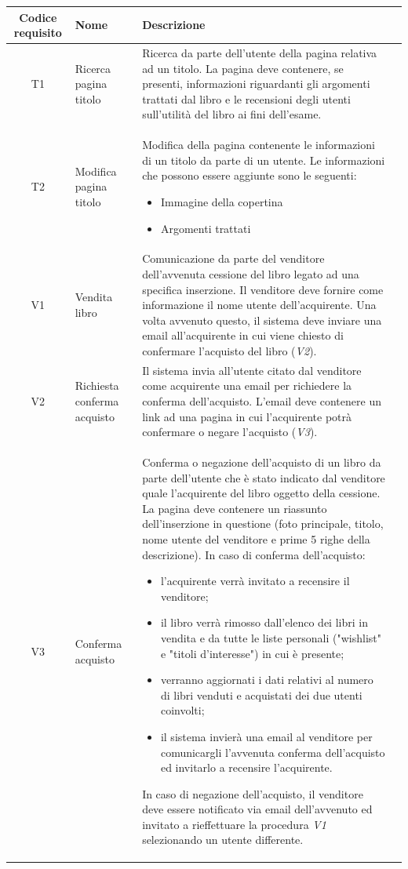 \documentclass[10pt,a4paper]{report}
\begin{document}
	\begin{tabular}{cp{3cm}p{9cm}p{1cm}}
		Codice requisito&Nome&Descrizione\\ \hline
		T1&Ricerca pagina titolo&Ricerca da parte dell'utente della pagina relativa ad un titolo. La pagina deve contenere, se presenti, informazioni riguardanti gli argomenti trattati dal libro e le recensioni degli utenti sull'utilità del libro ai fini dell'esame.\\ \hline
		T2&Modifica pagina titolo&Modifica della pagina contenente le informazioni di un titolo da parte di un utente. Le informazioni che possono essere aggiunte sono le seguenti:
		\begin{itemize}
			\item Immagine della copertina
			\item Argomenti trattati
		\end{itemize}\\ \hline
		V1&Vendita libro&Comunicazione da parte del venditore dell'avvenuta cessione del libro legato ad una specifica inserzione. Il venditore deve fornire come informazione il nome utente dell'acquirente. Una volta avvenuto questo, il sistema deve inviare una email all'acquirente in cui viene chiesto di confermare l'acquisto del libro (\textit{V2}).\\ \hline
		V2&Richiesta conferma acquisto&Il sistema invia all'utente citato dal venditore come acquirente una email per richiedere la conferma dell'acquisto. L'email deve contenere un link ad una pagina in cui l'acquirente potrà confermare o negare l'acquisto (\textit{V3}).\\ \hline
		V3&Conferma acquisto&Conferma o negazione dell'acquisto di un libro da parte dell'utente che è stato indicato dal venditore quale l'acquirente del libro oggetto della cessione. La pagina deve contenere un riassunto dell'inserzione in questione (foto principale, titolo, nome utente del venditore e prime 5 righe della descrizione).
		In caso di conferma dell'acquisto:
		\begin{itemize}
			\item l'acquirente verrà invitato a recensire il venditore;
			\item il libro verrà rimosso dall'elenco dei libri in vendita e da tutte le liste personali ("wishlist" e "titoli d'interesse") in cui è presente;
			\item verranno aggiornati i dati relativi al numero di libri venduti e acquistati dei due utenti coinvolti;
			\item il sistema invierà una email al venditore per comunicargli l'avvenuta conferma dell'acquisto ed invitarlo a recensire l'acquirente.
		\end{itemize}
		In caso di negazione dell'acquisto, il venditore deve essere notificato via email dell'avvenuto ed invitato a rieffettuare la procedura \textit{V1} selezionando un utente differente. \\ \hline
	\end{tabular}
\end{document}
